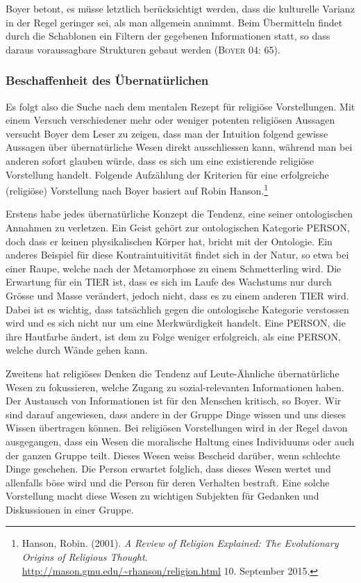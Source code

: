 Boyer betont, es müsse letztlich berücksichtigt werden, dass die kulturelle Varianz in der Regel geringer sei, als man allgemein annimmt. Beim Übermitteln findet durch die Schablonen ein Filtern der gegebenen Informationen statt, so dass daraus voraussagbare Strukturen gebaut werden (\textsc{Boyer 04: 65}).

\subsubsection{Beschaffenheit des Übernatürlichen}
Es folgt also die Suche nach dem mentalen Rezept für religiöse Vorstellungen. Mit einem Versuch verschiedener mehr oder weniger potenten religiösen Aussagen versucht Boyer dem Leser zu zeigen, dass man der Intuition folgend gewisse Aussagen über übernatürliche Wesen direkt ausschliessen kann, während man bei anderen sofort glauben würde, dass es sich um eine existierende religiöse Vorstellung handelt. Folgende Aufzählung der Kriterien für eine erfolgreiche (religiöse) Vorstellung nach Boyer basiert auf Robin Hanson.\footnote{Hanson, Robin. (2001). \emph{A Review of Religion Explained: The Evolutionary Origins of Religious Thought}. \\ \url{http://mason.gmu.edu/~rhanson/religion.html} 10. September 2015.} 

Erstens habe jedes übernatürliche Konzept die Tendenz, eine seiner ontologischen Annahmen zu verletzen. Ein Geist gehört zur ontologischen Kategorie PERSON, doch dass er keinen physikalischen Körper hat, bricht mit der Ontologie. Ein anderes Beispiel für diese Kontraintuitivität findet sich in der Natur, so etwa bei einer Raupe, welche nach der Metamorphose zu einem Schmetterling wird. Die Erwartung für ein TIER ist, dass es sich im Laufe des Wachstums nur durch Grösse und Masse verändert, jedoch nicht, dass es zu einem anderen TIER wird. Dabei ist es wichtig, dass tatsächlich gegen die ontologische Kategorie verstossen wird und es sich nicht nur um eine Merkwürdigkeit handelt. Eine PERSON, die ihre Hautfarbe ändert, ist dem zu Folge weniger erfolgreich, als eine PERSON, welche durch Wände gehen kann. 

Zweitens hat religiöses Denken die Tendenz auf Leute-Ähnliche übernatürliche Wesen zu fokussieren, welche Zugang zu sozial-relevanten Informationen haben. Der Austausch von Informationen ist für den Menschen kritisch, so Boyer. Wir sind darauf angewiesen, dass andere in der Gruppe Dinge wissen und uns dieses Wissen übertragen können. Bei religiösen Vorstellungen wird in der Regel davon ausgegangen, dass ein Wesen die moralische Haltung eines Individuums oder auch der ganzen Gruppe teilt. Dieses Wesen weiss Bescheid darüber, wenn schlechte Dinge geschehen. Die Person erwartet folglich, dass dieses Wesen wertet und allenfalls böse wird und die Person für deren Verhalten bestraft. Eine solche Vorstellung macht diese Wesen zu wichtigen Subjekten für Gedanken und Diskussionen in einer Gruppe. 

